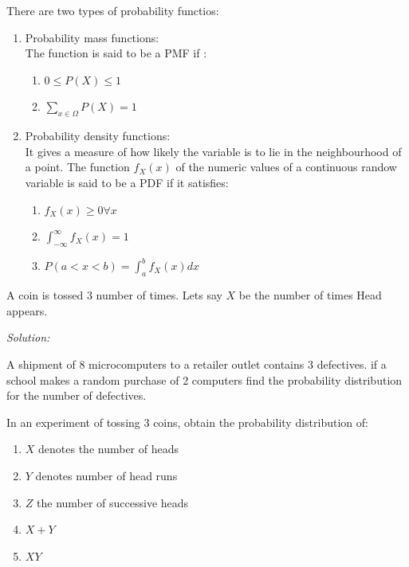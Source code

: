 \documentclass[11pt,letterpaper]{article}
\newenvironment{problem}[2][Problem]                                  
        {\begin{tcolorbox}[colback=white,colframe=gray!50,title=#1 #2]}
        {\end{tcolorbox}}
\newenvironment{solution}                      
        {\begin{mdframed}\textit{Solution:} \\}
        {\end{mdframed}}
\begin{document}
There are two types of probability functios: 
\begin{enumerate}
  \item Probability mass functions: \\
    The function is said to be a PMF if : 
    \begin{enumerate}
      \item $ 0 \leq P(X) \leq 1 $ 
      \item $\displaystyle \sum_{x \in \Omega} P(X) = 1 $ 
    \end{enumerate}
  \item Probability density functions:\\
    It gives a measure of how likely the variable is to lie in the neighbourhood of a point.
    The function $f_X(x)$ of the numeric values of a continuous randow variable is said to be a PDF if it satisfies:
    \begin{enumerate}
      \item $ f_X(x) \geq 0 \forall x$ 
      \item $\displaystyle \int_{-\infty}^\infty f_X(x) = 1$ 
      \item $\displaystyle P(a<x<b) = \int_a^b f_X(x) dx$
    \end{enumerate}
\end{enumerate}

\begin{problem}9
  A coin is tossed 3 number of times. Lets say $X$ be the number of times Head appears.
\end{problem}

\begin{solution}
  \begin{center}
  \end{center}
\end{solution}

\begin{problem}{10}
  A shipment of 8 microcomputers to a retailer outlet contains 3 defectives. 
  if a school makes a random purchase of 2 computers find the probability distribution for the number of defectives. 
\end{problem}

\begin{problem}{11}
  In an experiment of tossing 3 coins, obtain the probability distribution of: 
  \begin{enumerate}
    \item $X$ denotes the number of heads
    \item $Y$ denotes number of head runs
    \item $Z$ the number of successive heads
    \item $X+Y$ 
    \item $XY$
  \end{enumerate}
\end{problem}
\end{document}
